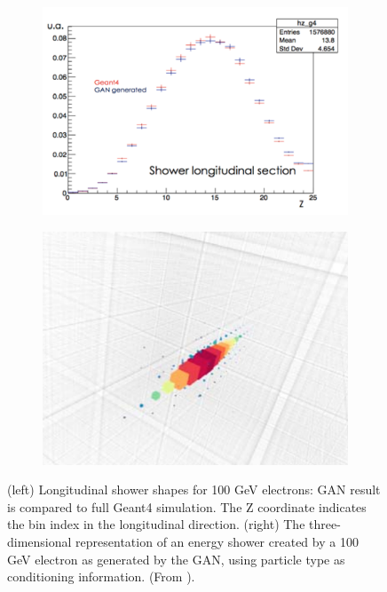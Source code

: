 \begin{figure}[h]
    \centering
    \begin{subfigure}[b]{0.54\textwidth}
    \centering
\includegraphics [width=\textwidth]{images/3dgan.png}
    \end{subfigure}
    \hfill
        \begin{subfigure}[b]{0.44\textwidth}
        \includegraphics [width=\textwidth]{images/3dgan1.png}

        \end{subfigure}
        \caption{(left) Longitudinal shower shapes for 100 GeV electrons: GAN result is compared to full Geant4
simulation. The Z coordinate indicates the bin index in the longitudinal direction. (right) The three-dimensional representation of an energy shower created by a 100
GeV electron as generated by the GAN, using particle type as conditioning information. (From \cite{Carminati2018}).}
        \label{fig:3dgan}

\end{figure}

